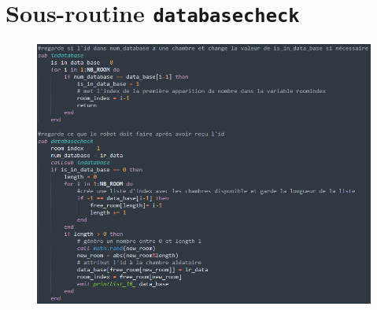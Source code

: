 \chapter{Sous-routine \texttt{databasecheck}}
\label{app:databasecheck}

\begin{figure}[h]
  \centering
  \includegraphics[width=\textwidth]{code/server_aseba_databasecheck}
\end{figure}

